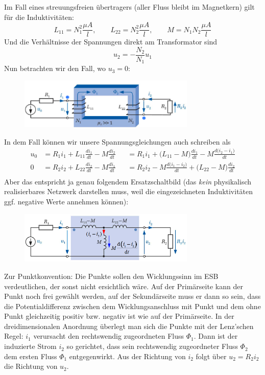 Im Fall eines streuungsfreien übertragers (aller Fluss bleibt im Magnetkern) gilt für die Induktivitäten:
$$ L_{11}= N_1^2\frac{\mu A}{l}, \qquad L_{22}= N_2^2\frac{\mu A}{l}, \qquad M = N_1N_2 \frac{\mu A}{l}$$
Und die Verhältnisse der Spannungen direkt am Transformator sind
$$u_2 =-\frac{N_2}{N_1}u_1$$
Nun betrachten wir den Fall, wo $u_3=0$:
\begin{figure}[H]
	\center
	\includegraphics[width=0.75\textwidth]{img/Tra3}
	\vspace{-0.2cm}
\end{figure}
In dem Fall können wir unsere Spannungsgleichungen auch schreiben als
\begin{equation*}
	\begin{alignedat}{2}
		u_0 &= R_1i_1 + L_{11}\frac{di_1}{dt} - M\frac{di_2}{dt} &&= R_1i_1 + \big(L_{11}-M\big)\frac{di_1}{dt} - M \frac{d\big(i_2-i_1\big)}{dt}\\
		0 &= R_2i_2 + L_{22}\frac{di_2}{dt} - M\frac{di_1}{dt} && = R_2i_2 - M \frac{d\big(i_1-i_2\big)}{dt} + \big(L_{22}-M\big) \frac{di_2}{dt} \\
	\end{alignedat}
\end{equation*}
Aber das entspricht ja genau folgendem Ersatzschaltbild (das \textit{kein} physikalisch realisierbares Netzwerk darstellen muss, weil die eingezeichneten Induktivitäten ggf. negative Werte annehmen können):
\begin{figure}[H]
	\center
	\includegraphics[width=0.75\textwidth]{img/Tra4}
	\vspace{-0.2cm}
\end{figure}
Zur Punktkonvention: \newline
Die Punkte sollen den Wicklungssinn im ESB verdeutlichen, der sonst nicht ersichtlich wäre.
Auf der Primärseite kann der Punkt noch frei gewählt werden, auf der Sekundärseite muss er dann so sein, dass die Potentialdifferenz zwischen dem Wicklungsanschluss mit Punkt und dem ohne Punkt gleichzeitig positiv bzw. negativ ist wie auf der Primärseite. \newline
In der dreidimensionalen Anordnung überlegt man sich die Punkte mit der Lenz'schen Regel: $i_1$ verursacht den rechtswendig zugeordneten Fluss $\Phi_1$. Dann ist der induzierte Strom $i_2$ so gerichtet, dass sein rechtswendig zugeordneter Fluss $\Phi_2$ dem ersten Fluss $\Phi_1$ entgegenwirkt. Aus der Richtung von $i_2$ folgt über $u_2 = R_2 i_2$ die Richtung von $u_2$.\newline

